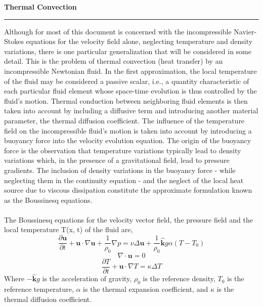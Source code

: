 \documentclass[12pt]{article}
\begin{document}
\pagebreak

\begin{huge}
\begin{center}
\textbf{Thermal Convection}
\noindent\rule{16.5cm}{0.4pt}
\end{center}
\end{huge}

\begin{flushleft}
Although for most of this document is concerned with the incompressible Navier-Stokes equations for the velocity field alone, neglecting
temperature and density variations, there is one particular generalization
that will be considered in some detail. This is the problem of thermal
convection (heat transfer) by an incompressible Newtonian fluid. In the
first approximation, the local temperature of the fluid may be considered a passive scalar, i.e., a quantity characteristic of each particular
fluid element whose space-time evolution is thus controlled by the fluid's
motion. Thermal conduction between neighboring fluid elements is then
taken into account by including a diffusive term and introducing another material parameter, the thermal diffusion coefficient. The influence
of the temperature field on the incompressible fluid's motion is taken
into account by introducing a buoyancy force into the velocity evolution equation. The origin of the buoyancy force is the observation that
temperature variations typically lead to density variations which, in the
presence of a gravitational field, lead to pressure gradients. The inclusion
of density variations in the buoyancy force - while neglecting them in
the continuity equation - and the neglect of the local heat source due to
viscous dissipation constitute the approximate formulation known as the
Boussinesq equations.
\\~\\
The Boussinesq equations for the velocity vector field, the pressure
field and the local temperature T(x, t) of the fluid are,
$$\frac{\partial \textbf{u}}{\partial t}+\textbf{u}\cdot\nabla\textbf{u}+\frac{1}{\rho_0}\nabla p = \nu\Delta\textbf{u}+\frac{1}{\rho_0}\hat{\textbf{k}}g\alpha(T-T_0)$$
$$\nabla\cdot\textbf{u} = 0$$
$$\frac{\partial T}{\partial t}+\textbf{u}\cdot\nabla T = \kappa\Delta T$$
Where $-\hat{\textbf{k}}g$ is the acceleration of gravity, $\rho_0$ is the reference density, $T_0$ is the reference temperature, $\alpha$ is the thermal expansion coefficient, and $\kappa$ is the thermal diffusion coefficient.
\\~\\

\end{flushleft}
\end{document}
